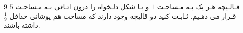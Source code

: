 \exercise
$9$
قـالـیچه هـر یک بـه مـساحـت
$1$
 و بـا شکل دلـخواه را درون اتـاقی بـه مـساحـت
$5$
 قـرار می دهـیم. ثـابـت کنید دو قالیچه وجود دارند که مساحت هم پوشانی حداقل
$\frac{1}{9}$
 داشته باشند.